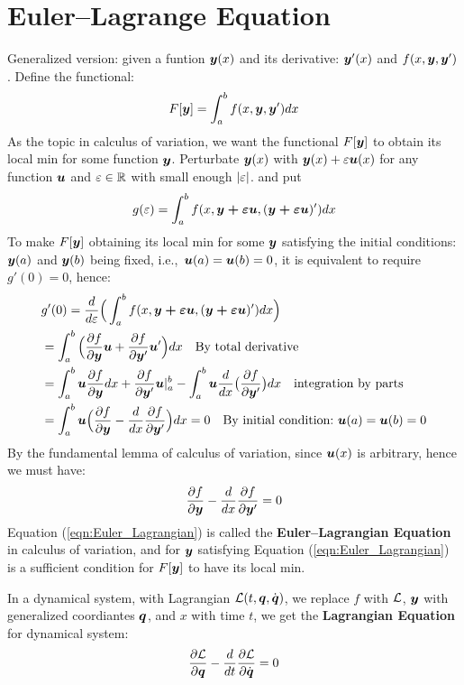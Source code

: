 \documentclass[hidelinks]{article}[12pt]
\begin{document}
\section{Euler--Lagrange Equation}
Generalized version: given a funtion $\boldsymbol{y}(x)$ and its derivative: $\boldsymbol{y}'(x)$ and $f(x, \boldsymbol{y}, \boldsymbol{y}')$. Define the functional:
\begin{equation}
F[\boldsymbol{y}] = \int_a^b f(x, \boldsymbol{y}, \boldsymbol{y}') dx \label{eqn:functional}
\end{equation}
As the topic in calculus of variation, we want the functional $F[\boldsymbol{y}]$ to obtain its local min for some function $\boldsymbol{y}$. Perturbate $\boldsymbol{y}(x)$ with $\boldsymbol{y}(x) + \varepsilon \boldsymbol{u}(x)$ for any function $\boldsymbol{u}$ and $\varepsilon \in \mathbb R$ with small enough $\left|\varepsilon\right|$. and put \[g(\varepsilon) = \int_a^b f(x, \boldsymbol{y + \varepsilon u}, (\boldsymbol{y + \varepsilon u})') dx\]
To make $F[\boldsymbol{y}]$ obtaining its local min for some $\boldsymbol{y}$ satisfying the initial conditions: $\boldsymbol{y}(a)$ and $\boldsymbol{y}(b)$ being fixed, i.e.,\ $\boldsymbol{u}(a) = \boldsymbol{u}(b) = 0$, it is equivalent to require $g'(0) = 0$, hence:
\begin{align*}
& g'(0) = \frac{d}{d\varepsilon}\Big(\int_a^b f(x, \boldsymbol{y + \varepsilon u}, (\boldsymbol{y + \varepsilon u})') dx\Big)\\
& = \int_a^b \Big(\frac{\partial{f}}{\partial{\boldsymbol{y}}}\boldsymbol{u} + \frac{\partial{f}}{\partial{\boldsymbol{y}'}}\boldsymbol{u}' \Big)dx \quad \text{By total derivative}\\
& = \int_a^b \boldsymbol{u} \frac{\partial{f}}{\partial{\boldsymbol{y}}}  dx + \frac{\partial{f}}{\partial{\boldsymbol{y}'}}\boldsymbol{u} \vert_a^b - \int_a^b \boldsymbol{u} \frac{d}{dx}\big(\frac{\partial{f}}{\partial{\boldsymbol{y}'}}\big) dx \quad \text{integration by parts}\\
& = \int_a^b \boldsymbol{u} \Big(\frac{\partial{f}}{\partial{\boldsymbol{y}}} - \frac{d}{dx}\frac{\partial{f}}{\partial{\boldsymbol{y}'}}\Big) dx = 0 \quad \text{By initial condition:} ~ \boldsymbol{u}(a) = \boldsymbol{u}(b) = 0
\end{align*}
By the fundamental lemma of calculus of variation, since $\boldsymbol{u}(x)$ is arbitrary, hence we must have:
\begin{equation}
\frac{\partial{f}}{\partial{\boldsymbol{y}}} - \frac{d}{dx}\frac{\partial{f}}{\partial{\boldsymbol{y}'}} = 0 \label{eqn:Euler_Lagrangian}
\end{equation}
Equation (\ref{eqn:Euler_Lagrangian}) is called the \textbf{Euler--Lagrangian Equation} in calculus of variation, and for $\boldsymbol{y}$ satisfying Equation (\ref{eqn:Euler_Lagrangian}) is a sufficient condition for $F[\boldsymbol{y}]$ to have its local min.

In a dynamical system, with Lagrangian ${\cal L}(t, \boldsymbol{q}, \dot{\boldsymbol{q}})$, we replace $f$ with ${\cal L}$, $\boldsymbol{y}$ with generalized coordiantes $\boldsymbol{q}$, and $x$ with time $t$, we get the \textbf{Lagrangian Equation} for dynamical system:
\begin{equation}
\frac{\partial{{\cal L}}}{\partial{\boldsymbol{q}}} - \frac{d}{dt}\frac{\partial{{\cal L}}}{\partial{\dot{\boldsymbol{q}}}} = 0 \label{eqn:Lagrangian} 
\end{equation}
\end{document}
